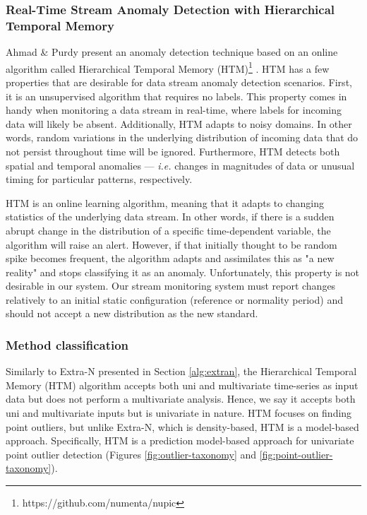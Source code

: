 \subsubsection{Real-Time Stream Anomaly Detection with Hierarchical Temporal Memory}
Ahmad \& Purdy present an anomaly detection technique based on an online algorithm called Hierarchical Temporal Memory (HTM)\footnote{https://github.com/numenta/nupic} \cite{Ahmad-HTM}. HTM has a few properties that are desirable for data stream anomaly detection scenarios. First, it is an unsupervised algorithm that requires no labels. This property comes in handy when monitoring a data stream in real-time, where labels for incoming data will likely be absent. Additionally, HTM adapts to noisy domains. In other words, random variations in the underlying distribution of incoming data that do not persist throughout time will be ignored. Furthermore, HTM detects both spatial and temporal anomalies --- \textit{i.e.} changes in magnitudes of data or unusual timing for particular patterns, respectively.   

HTM is an online learning algorithm, meaning that it adapts to changing statistics of the underlying data stream. In other words, if there is a sudden abrupt change in the distribution of a specific time-dependent variable, the algorithm will raise an alert. However, if that initially thought to be random spike becomes frequent, the algorithm adapts and assimilates this as "a new reality" and stops classifying it as an anomaly. Unfortunately, this property is not desirable in our system. Our stream monitoring system must report changes relatively to an initial static configuration (reference or normality period) and should not accept a new distribution as the new standard.

\subsubsection*{Method classification}
Similarly to Extra-N presented in Section \ref{alg:extran}, the Hierarchical Temporal Memory (HTM) algorithm accepts both uni and multivariate time-series as input data but does not perform a multivariate analysis. Hence, we say it accepts both uni and multivariate inputs but is univariate in nature. HTM focuses on finding point outliers, but unlike Extra-N, which is density-based, HTM is a model-based approach. Specifically, HTM is a prediction model-based approach for univariate point outlier detection (Figures \ref{fig:outlier-taxonomy} and \ref{fig:point-outlier-taxonomy}).


